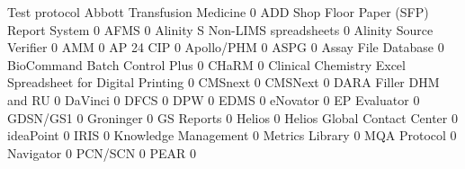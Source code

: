 \documentclass{article}
\begin{document}
\begin{Schunk}
\begin{Soutput}
                                                            Test protocol
  Abbott Transfusion Medicine                                           0
  ADD Shop Floor Paper (SFP) Report System                              0
  AFMS                                                                  0
  Alinity S Non-LIMS spreadsheets                                       0
  Alinity Source Verifier                                               0
  AMM                                                                   0
  AP 24 CIP                                                             0
  Apollo/PHM                                                            0
  ASPG                                                                  0
  Assay File Database                                                   0
  BioCommand Batch Control Plus                                         0
  CHaRM                                                                 0
  Clinical Chemistry Excel Spreadsheet for Digital Printing             0
  CMSnext                                                               0
  CMSNext                                                               0
  DARA Filler DHM and RU                                                0
  DaVinci                                                               0
  DFCS                                                                  0
  DPW                                                                   0
  EDMS                                                                  0
  eNovator                                                              0
  EP Evaluator                                                          0
  GDSN/GS1                                                              0
  Groninger                                                             0
  GS Reports                                                            0
  Helios                                                                0
  Helios Global Contact Center                                          0
  ideaPoint                                                             0
  IRIS                                                                  0
  Knowledge Management                                                  0
  Metrics Library                                                       0
  MQA Protocol                                                          0
  Navigator                                                             0
  PCN/SCN                                                               0
  PEAR                                                                  0

\end{Soutput}
\end{Schunk}
\end{document}
